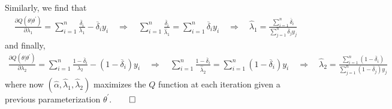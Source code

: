 \documentclass[10pt]{article}
\newcommand{\1}[1]{\mathbbm{1}_{#1}}
\begin{document}
    Similarly, we find that
    \begin{align*}
        \frac{\partial Q(\theta|\theta^\prime)}{\partial\lambda_1}=\sum_{i=1}^n\frac{\overline{\delta}_i}{\lambda_1}-\overline{\delta}_iy_i\quad\Rightarrow\quad\sum_{i=1}^n\frac{\overline{\delta}_i}{\hat{\lambda}_1}=\sum_{i=1}^n\overline{\delta}_iy_i\quad\Rightarrow\quad\hat{\lambda}_1=\frac{\sum_{i=1}^n\overline{\delta}_i}{\sum_{j=1}^n\overline{\delta}_jy_j}
    \end{align*}
    and finally,
    \begin{align*}
        \frac{\partial Q(\theta|\theta^\prime)}{\partial\lambda_2}=\sum_{i=1}^n\frac{1-\overline{\delta}_i}{\lambda_2}-(1-\overline{\delta}_i)y_i\quad\Rightarrow\quad\sum_{i=1}^n\frac{1-\overline{\delta}_i}{\hat{\lambda}_2}=\sum_{i=1}^n(1-\overline{\delta}_i)y_i\quad\Rightarrow\quad\hat{\lambda}_2=\frac{\sum_{i=1}^n(1-\overline{\delta}_i)}{\sum_{j=1}^n(1-\overline{\delta}_j)y_j}
    \end{align*}
    where now $(\hat{\alpha},\hat{\lambda}_1,\hat{\lambda}_2)$ maximizes the $Q$ function at each iteration given a previous parameterization $\theta^\prime$.\hfill{$\qed$}
\end{document}
